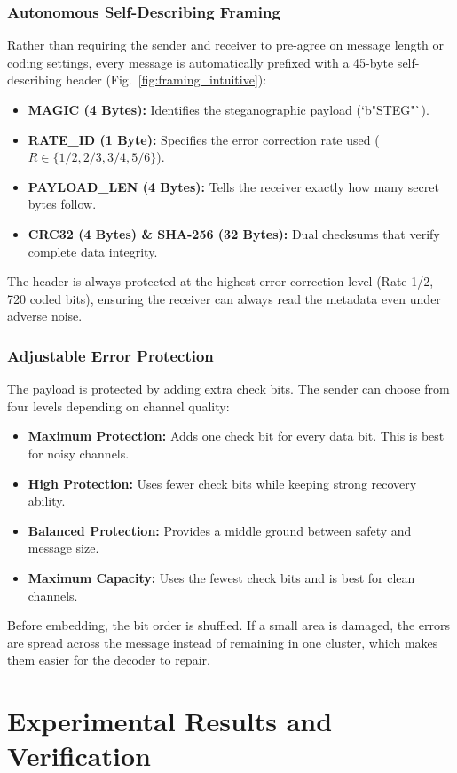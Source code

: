 \documentclass[conference]{IEEEtran}
\begin{document}
\subsubsection{Autonomous Self-Describing Framing}
Rather than requiring the sender and receiver to pre-agree on message length or coding settings, every message is automatically prefixed with a 45-byte self-describing header (Fig.~\ref{fig:framing_intuitive}):
\begin{itemize}
    \item \textbf{MAGIC (4 Bytes):} Identifies the steganographic payload (`b"STEG"`).
    \item \textbf{RATE\_ID (1 Byte):} Specifies the error correction rate used ($R \in \{1/2, 2/3, 3/4, 5/6\}$).
    \item \textbf{PAYLOAD\_LEN (4 Bytes):} Tells the receiver exactly how many secret bytes follow.
    \item \textbf{CRC32 (4 Bytes) \& SHA-256 (32 Bytes):} Dual checksums that verify complete data integrity.
\end{itemize}
The header is always protected at the highest error-correction level (Rate 1/2, 720 coded bits), ensuring the receiver can always read the metadata even under adverse noise.

\subsubsection{Adjustable Error Protection}
The payload is protected by adding extra check bits. The sender can choose from four levels depending on channel quality:
\begin{itemize}
    \item \textbf{Maximum Protection:} Adds one check bit for every data bit. This is best for noisy channels.
    \item \textbf{High Protection:} Uses fewer check bits while keeping strong recovery ability.
    \item \textbf{Balanced Protection:} Provides a middle ground between safety and message size.
    \item \textbf{Maximum Capacity:} Uses the fewest check bits and is best for clean channels.
\end{itemize}
Before embedding, the bit order is shuffled. If a small area is damaged, the errors are spread across the message instead of remaining in one cluster, which makes them easier for the decoder to repair.

\section{Experimental Results and Verification}
\end{document}
